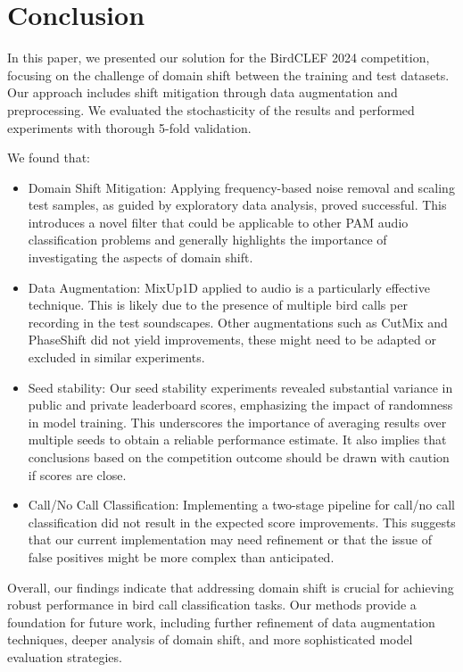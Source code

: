 \documentclass[
]{ceurart}
\begin{document}
\section{Conclusion} \label{conclusion}
In this paper, we presented our solution for the BirdCLEF 2024 competition, focusing on the challenge of domain shift between the training and test datasets. Our approach includes shift mitigation through data augmentation and preprocessing. We evaluated the stochasticity of the results and performed experiments with thorough 5-fold validation. 

We found that:
\begin{itemize}
    \item Domain Shift Mitigation: Applying frequency-based noise removal and scaling test samples, as guided by exploratory data analysis, proved successful. This introduces a novel filter that could be applicable to other PAM audio classification problems and generally highlights the importance of investigating the aspects of domain shift.
    \item Data Augmentation: MixUp1D applied to audio is a particularly effective technique. This is likely due to the presence of multiple bird calls per recording in the test soundscapes. Other augmentations such as CutMix and PhaseShift did not yield improvements, these might need to be adapted or excluded in similar experiments.
    \item Seed stability: Our seed stability experiments revealed substantial variance in public and private leaderboard scores, emphasizing the impact of randomness in model training. This underscores the importance of averaging results over multiple seeds to obtain a reliable performance estimate. It also implies that conclusions based on the competition outcome should be drawn with caution if scores are close.
    \item Call/No Call Classification: Implementing a two-stage pipeline for call/no call classification did not result in the expected score improvements. This suggests that our current implementation may need refinement or that the issue of false positives might be more complex than anticipated.
\end{itemize}

Overall, our findings indicate that addressing domain shift is crucial for achieving robust performance in bird call classification tasks. Our methods provide a foundation for future work, including further refinement of data augmentation techniques, deeper analysis of domain shift, and more sophisticated model evaluation strategies.
\end{document}
